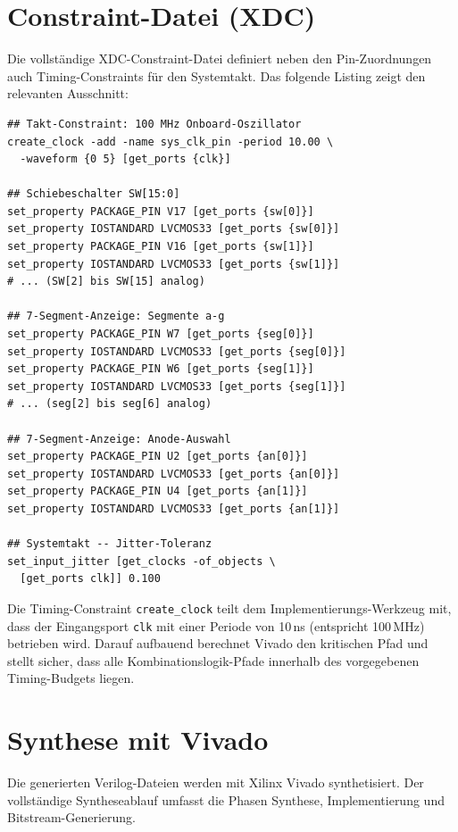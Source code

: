 ﻿\documentclass[12pt,a4paper]{report}
\begin{document}
\section{Constraint-Datei (XDC)}
\label{sec:xdc_constraints}

Die vollständige XDC-Constraint-Datei definiert neben den Pin-Zuordnungen auch Timing-Constraints für den Systemtakt. Das folgende Listing zeigt den relevanten Ausschnitt:

\begin{lstlisting}[style=bashstyle, caption={Basys3\_Master.xdc -- Ausschnitt für ALU-Design}, label={lst:xdc}]
## Takt-Constraint: 100 MHz Onboard-Oszillator
create_clock -add -name sys_clk_pin -period 10.00 \
  -waveform {0 5} [get_ports {clk}]

## Schiebeschalter SW[15:0]
set_property PACKAGE_PIN V17 [get_ports {sw[0]}]
set_property IOSTANDARD LVCMOS33 [get_ports {sw[0]}]
set_property PACKAGE_PIN V16 [get_ports {sw[1]}]
set_property IOSTANDARD LVCMOS33 [get_ports {sw[1]}]
# ... (SW[2] bis SW[15] analog)

## 7-Segment-Anzeige: Segmente a-g
set_property PACKAGE_PIN W7 [get_ports {seg[0]}]
set_property IOSTANDARD LVCMOS33 [get_ports {seg[0]}]
set_property PACKAGE_PIN W6 [get_ports {seg[1]}]
set_property IOSTANDARD LVCMOS33 [get_ports {seg[1]}]
# ... (seg[2] bis seg[6] analog)

## 7-Segment-Anzeige: Anode-Auswahl
set_property PACKAGE_PIN U2 [get_ports {an[0]}]
set_property IOSTANDARD LVCMOS33 [get_ports {an[0]}]
set_property PACKAGE_PIN U4 [get_ports {an[1]}]
set_property IOSTANDARD LVCMOS33 [get_ports {an[1]}]

## Systemtakt -- Jitter-Toleranz
set_input_jitter [get_clocks -of_objects \
  [get_ports clk]] 0.100
\end{lstlisting}

Die Timing-Constraint \texttt{create\_clock} teilt dem Implementierungs-Werkzeug mit, dass der Eingangsport \texttt{clk} mit einer Periode von 10\,ns (entspricht 100\,MHz) betrieben wird. Darauf aufbauend berechnet Vivado den kritischen Pfad und stellt sicher, dass alle Kombinationslogik-Pfade innerhalb des vorgegebenen Timing-Budgets liegen.

\section{Synthese mit Vivado}
\label{sec:vivado_synthese}

Die generierten Verilog-Dateien werden mit Xilinx Vivado synthetisiert. Der vollständige Syntheseablauf umfasst die Phasen Synthese, Implementierung und Bitstream-Generierung.
\end{document}
